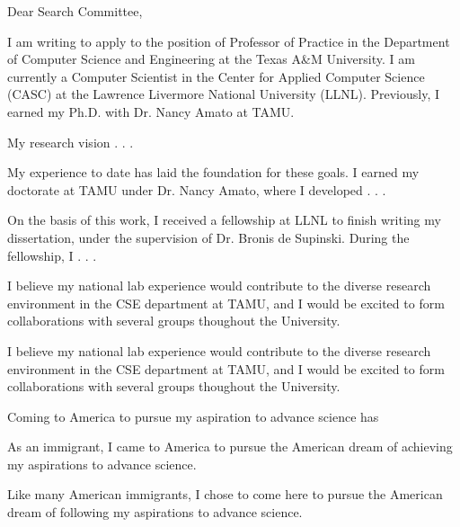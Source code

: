 \documentclass[11pt]{article}
\begin{document}
Dear Search Committee,

I am writing to apply to the position of Professor of Practice in the Department of Computer Science and Engineering at the Texas A\&M University.  I am currently a Computer Scientist in the Center for Applied Computer Science (CASC) at the Lawrence Livermore National University (LLNL).  Previously, I earned my Ph.D. with Dr. Nancy Amato at TAMU.

My research vision . . .

My experience to date has laid the foundation for these goals.  I earned my doctorate at TAMU under Dr. Nancy Amato, where I developed . . .

On the basis of this work, I received a fellowship at LLNL to finish writing my dissertation, under the supervision of Dr. Bronis de Supinski.
During the fellowship, I . . .

I believe my national lab experience would contribute to the diverse research environment in the CSE department at TAMU, and I would be excited to form collaborations with several groups thoughout the University.

I believe my national lab experience would contribute to the diverse research environment in the CSE department at TAMU, and I would be excited to form collaborations with several groups thoughout the University.

Coming to America to pursue my aspiration to advance science has

As an immigrant, I came to America to pursue the American dream of achieving my aspirations to advance science.

Like many American immigrants, I chose to come here to pursue the American dream of following my aspirations to advance science.
\end{document}
